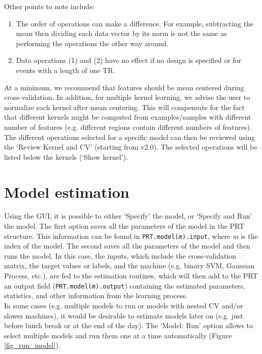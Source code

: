 \noindent Other points to note include:
\begin{enumerate}
\item The order of operations can make a difference. For example, subtracting the mean then dividing each data vector by its norm is not the same as performing the operations the other way around.
\item Data operations (1) and (2) have no effect if no design is specified or for events with a length of one TR.
\end{enumerate}

At a minimum, we recommend that features should be mean centered during cross-validation. In addition, for multiple kernel learning, we advise the user to normalize each kernel after mean centering. This will compensate for the fact that different kernels might be computed from examples/samples with different number of features (e.g. different regions contain different numbers of features). 
\\

The different operations selected for a specific model can then be reviewed using the `Review Kernel and CV' (starting from v2.0). The selected operations will be listed below the kernels (`Show kernel').

\section{Model estimation}

Using the GUI, it is possible to either `Specify' the model, or `Specify and Run' the model. The first option saves all the parameters of the model in the PRT structure. This information can be found in \texttt{PRT.model(\textit{m}).input}, where \textit{m} is the index of the model. The second saves all the parameters of the model and then runs the model. In this case, the inputs, which include the cross-validation matrix, the target values or labels, and the machine (e.g. binary SVM, Gaussian Process, etc.), are fed to the estimation routines, which will then add to the PRT an output field (\texttt{PRT.model(\textit{m}).output}) containing the estimated parameters, statistics, and other information from the learning process.
\\

In some cases (e.g. multiple models to run or models with nested CV and/or slower machines), it would be desirable to estimate models later on (e.g. just before lunch break or at the end of the day). The `Model: Run' option allows to select multiple models and run them one at a time automatically (Figure \ref{fig_run_model}).
\\


